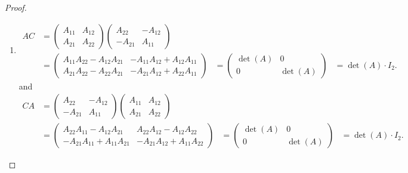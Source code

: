 \begin{proof} \ 

\begin{enumerate}
\item
\begin{align*}
    AC & =
        \begin{pmatrix}
            A_{11} & A_{12} \\
            A_{21} & A_{22}
        \end{pmatrix}
        \begin{pmatrix}
            A_{22} & -A_{12} \\
            -A_{21} & A_{11}
        \end{pmatrix} \\
      & = \begin{pmatrix}
            A_{11} A_{22} - A_{12} A_{21} & -A_{11} A_{12} + A_{12} A_{11} \\
            A_{21} A_{22} - A_{22} A_{21} & - A_{21} A_{12} + A_{22} A_{11}
        \end{pmatrix}
      & = \begin{pmatrix}
          \det(A) & 0 \\
          0 & \det(A)
      \end{pmatrix}
      & = \det(A) \cdot I_2.
\end{align*}
and
\begin{align*}
   CA & =
        \begin{pmatrix}
            A_{22} & -A_{12} \\
            -A_{21} & A_{11}
        \end{pmatrix}
        \begin{pmatrix}
            A_{11} & A_{12} \\
            A_{21} & A_{22}
        \end{pmatrix} \\
      & = \begin{pmatrix}
            A_{22} A_{11} - A_{12} A_{21} & A_{22} A_{12} - A_{12} A_{22} \\
            -A_{21} A_{11} + A_{11} A_{21} & - A_{21} A_{12} + A_{11} A_{22}
        \end{pmatrix}
      & = \begin{pmatrix}
          \det(A) & 0 \\
          0 & \det(A)
      \end{pmatrix}
      & = \det(A) \cdot I_2. 
\end{align*}


\end{enumerate}
\end{proof}
